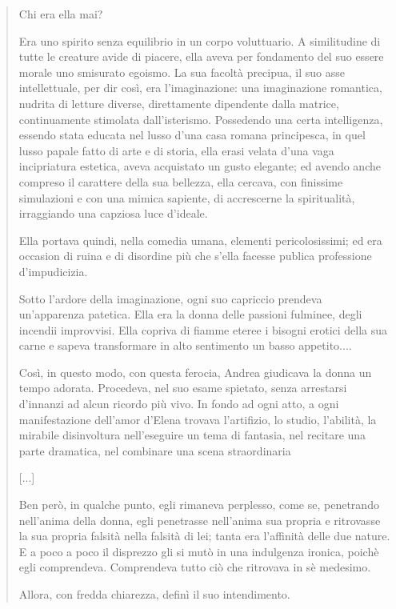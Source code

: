 \documentclass{book}
\newcounter{mar}
\begin{document}
\begin{quote}
Chi era ella mai?

Era uno spirito senza equilibrio in un corpo voluttuario. A similitudine di tutte le creature avide di piacere, ella aveva per fondamento del suo essere morale uno smisurato egoismo. La sua facoltà precipua, il suo asse intellettuale, per dir così, era l’imaginazione: una imaginazione romantica, nudrita di letture diverse, direttamente dipendente dalla matrice, continuamente stimolata dall’isterismo. Possedendo una certa intelligenza, essendo stata educata nel lusso d’una casa romana principesca, in quel lusso papale fatto di arte e di storia, ella erasi velata d’una vaga incipriatura estetica, aveva acquistato un gusto elegante; ed avendo anche compreso il carattere della sua bellezza, ella cercava, con finissime simulazioni e con una mimica sapiente, di accrescerne la spiritualità, irraggiando una capziosa luce d’ideale.

Ella portava quindi, nella comedia umana, elementi pericolosissimi; ed era occasion di ruina e di disordine più che s’ella facesse publica professione d’impudicizia.

Sotto l’ardore della imaginazione, ogni suo capriccio prendeva un’apparenza patetica. Ella era la donna delle passioni fulminee, degli incendii improvvisi. Ella copriva di fiamme eteree i bisogni erotici della sua carne e sapeva transformare in alto sentimento un basso appetito....

Così, in questo modo, con questa ferocia, Andrea giudicava la donna un tempo adorata. Procedeva, nel suo esame spietato, senza arrestarsi d’innanzi ad alcun ricordo più vivo. In fondo ad ogni atto, a ogni manifestazione dell’amor d’Elena trovava l’artifizio, lo studio, l’abilità, la mirabile disinvoltura nell’eseguire un tema di fantasia, nel recitare una parte dramatica, nel combinare una scena straordinaria

[...]

Ben però, in qualche punto, egli rimaneva perplesso, come se, penetrando nell’anima della donna, egli penetrasse nell’anima sua propria e ritrovasse la sua propria falsità nella falsità di lei; tanta era l’affinità delle due nature. E a poco a poco il disprezzo gli si mutò in una indulgenza ironica, poichè egli comprendeva. Comprendeva tutto ciò che ritrovava in sè medesimo.

Allora, con fredda chiarezza, definì il suo intendimento.


\end{quote}
\end{document}
